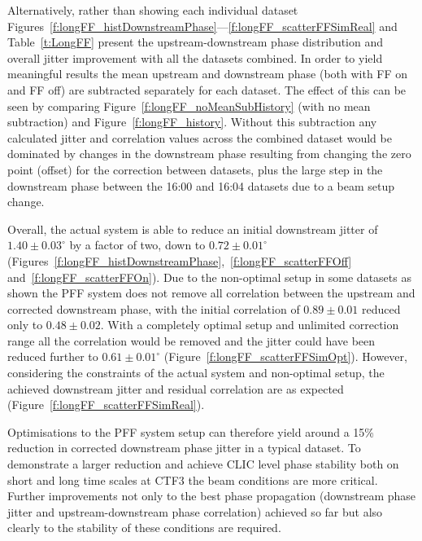 Alternatively, rather than showing each individual dataset Figures~\ref{f:longFF_histDownstreamPhase}---\ref{f:longFF_scatterFFSimReal} and Table~\ref{t:LongFF} present the upstream-downstream phase distribution and overall jitter improvement with all the datasets combined. In order to yield meaningful results the mean upstream and downstream phase (both with FF on and FF off) are subtracted separately for each dataset. The effect of this can be seen by comparing Figure~\ref{f:longFF_noMeanSubHistory} (with no mean subtraction) and Figure~\ref{f:longFF_history}. Without this subtraction any calculated jitter and correlation values across the combined dataset would be dominated by changes in the downstream phase resulting from changing the zero point (offset) for the correction between datasets, plus the large step in the downstream phase between the 16:00 and 16:04 datasets due to a beam setup change.

Overall, the actual system is able to reduce an initial downstream jitter of \(1.40\pm0.03^\circ\) by a factor of two, down to \(0.72\pm0.01^\circ\) (Figures~\ref{f:longFF_histDownstreamPhase},~\ref{f:longFF_scatterFFOff} and~\ref{f:longFF_scatterFFOn}). Due to the non-optimal setup in some datasets as shown the PFF system does not remove all correlation between the upstream and corrected downstream phase, with the initial correlation of \(0.89\pm0.01\) reduced only to \(0.48\pm0.02\). With a completely optimal setup and unlimited correction range all the correlation would be removed and the jitter could have been reduced further to \(0.61\pm0.01^\circ\) (Figure~\ref{f:longFF_scatterFFSimOpt}). However, considering the constraints of the actual system and non-optimal setup, the achieved downstream jitter and residual correlation are as expected (Figure~\ref{f:longFF_scatterFFSimReal}).


Optimisations to the PFF system setup can therefore yield around a 15\% reduction in corrected downstream phase jitter in a typical dataset. To demonstrate a larger reduction and achieve CLIC level phase stability both on short and long time scales at CTF3 the beam conditions are more critical. Further improvements not only to the best phase propagation (downstream phase jitter and upstream-downstream phase correlation) achieved so far but also clearly to the stability of these conditions are required.


